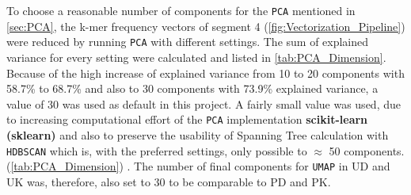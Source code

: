 To choose a reasonable number of components for the \texttt{PCA} mentioned in \autoref{sec:PCA}, the k-mer frequency vectors of segment 4 (\autoref{fig:Vectorization_Pipeline}) were reduced by running \texttt{PCA} with different settings. The sum of explained variance for every setting were calculated and listed in \autoref{tab:PCA_Dimension}. Because of the high increase of explained variance from 10 to 20 components with 58.7\% to 68.7\% and also to 30 components with 73.9\% explained variance, a value of 30 was used as default in this project. A fairly small value was used, due to increasing computational effort of the \texttt{PCA} implementation \textbf{scikit-learn (sklearn)} and also to preserve the usability of Spanning Tree calculation with \texttt{HDBSCAN} which is, with the preferred settings, only possible to $\approx$ 50 components. (\autoref{tab:PCA_Dimension}) \autocite{mcinnes_hdbscan_2017, scipy_10_contributors_scipy_2020}. The number of final components for \texttt{UMAP} in UD and UK was, therefore, also set to 30 to be comparable to PD and PK.

\begin{table}[!hbt]
    \centering
    \caption[Explained Variance by different PCA settings]{\textbf{Explained Variance by different PCA settings.} The explained variance of specific \texttt{PCA} settings used on the k-mer frequency vectors of segment 4. A result of 0.587 as for 10 components represents 58.7\% of the variance is explained by the first 10 components of the vector. The more components are extracted the lower the increase in additional explained variance \autocite{pearson_liii_1901}.}
    \label{tab:PCA_Dimension}
\end{table}

